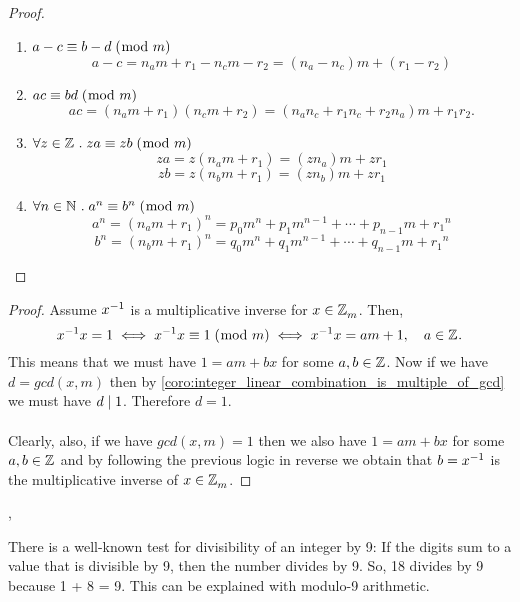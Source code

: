 \documentclass[../MathsNotesBase.tex]{subfiles}
\begin{document}
{\begin{proof}
\begin{enumerate}[label=(\roman*)]
				\item ${ a - c \equiv b - d \;(\bmod\; m) }$
				\[ a - c = n_a m + r_1 - n_c m - r_2 = (n_a - n_c)m + (r_1 - r_2) \]
				
				\item ${ ac \equiv bd \;(\bmod\; m) }$
				\[ ac = (n_a m + r_1)(n_c m + r_2) = (n_a n_c + r_1 n_c + r_2 n_a)m + r_1 r_2. \]
				
				\item ${ \forall z \in \mathbb{Z}^{} \;.\; za \equiv zb \;(\bmod\; m) }$
				\[ za = z(n_a m + r_1) = (z n_a)m + z r_1 \]
				\[ zb = z(n_b m + r_1) = (z n_b)m + z r_1 \]
				
				\item ${ \forall n \in \mathbb{N}^{} \;.\; a^n \equiv b^n \;(\bmod\; m) }$
				\[ a^n = (n_a m + r_1)^n = p_0 m^n + p_1 m^{n-1} + \cdots + p_{n-1} m + {r_1}^n \]
				\[ b^n = (n_b m + r_1)^n = q_0 m^n + q_1 m^{n-1} + \cdots + q_{n-1} m + {r_1}^n \]
			\end{enumerate}
		\end{proof}
		
		
		\bigskip
		\begin{proof}
			Assume ${ {x}^{-1} }$ is a multiplicative inverse for ${ x \in \mathbb{Z}^{}_m }$. Then,
			\[ {x}^{-1}x = 1 \iff {x}^{-1}x \equiv 1 \;(\bmod\; m) \iff {x}^{-1}{x} = am + 1, \hspace{10pt} a \in \mathbb{Z}^{}. \]
			This means that we must have ${ 1 = am + bx }$ for some ${ a,b \in \mathbb{Z}^{} }$. Now if we have ${ d = gcd(x,m) }$ then by \autoref{coro:integer_linear_combination_is_multiple_of_gcd} we must have ${ d \mid 1 }$. Therefore ${ d = 1 }$.\\\\
			Clearly, also, if we have ${ gcd(x,m) = 1 }$ then we also have ${ 1 = am + bx }$ for some ${ a,b \in \mathbb{Z}^{} }$ and by following the previous logic in reverse we obtain that ${ b = {x}^{-1} }$ is the multiplicative inverse of ${ x \in \mathbb{Z}^{}_m }$.
		\end{proof}
	
	
		\sep
		\begin{exe}
			\ex There is a well-known test for divisibility of an integer by 9: If the digits sum to a value that is divisible by 9, then the number divides by 9. So, 18 divides by 9 because 1 + 8 = 9. This can be explained with modulo-9 arithmetic.\\
			

\end{exe}}
\end{document}
